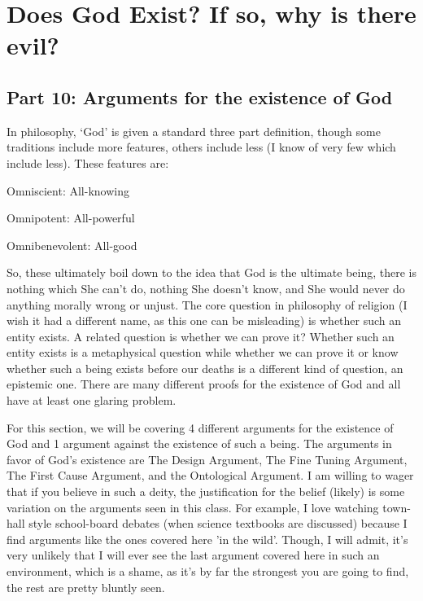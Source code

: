 \part{Does God Exist? If so, why is there evil?}
\label{ch.modfive}
\chapter{Part 10: Arguments for the existence of God}
In philosophy, ‘God’ is given a standard three part definition, though some traditions include more features, others include less (I know of very few which include less). These features are:
\begin{earg}
    \item[]Omniscient: All-knowing
    \item[]Omnipotent: All-powerful
    \item[]Omnibenevolent: All-good
\end{earg}
So, these ultimately boil down to the idea that God is the ultimate being, there is nothing which She can't do, nothing She doesn't know, and She would never do anything morally wrong or unjust. The core question in philosophy of religion (I wish it had a different name, as this one can be misleading) is whether such an entity exists. A related question is whether we can prove it? Whether such an entity exists is a metaphysical question while whether we can prove it or know whether such a being exists before our deaths is a different kind of question, an epistemic one. There are many different proofs for the existence of God and all have at least one glaring problem.

For this section, we will be covering 4 different arguments for the existence of God and 1 argument against the existence of such a being. The arguments in favor of God's existence are The Design Argument, The Fine Tuning Argument, The First Cause Argument, and the Ontological Argument. I am willing to wager that if you believe in such a deity, the justification for the belief (likely) is some variation on the arguments seen in this class. For example, I love watching town-hall style school-board debates (when science textbooks are discussed) because I find arguments like the ones covered here 'in the wild'. Though, I will admit, it's very unlikely that I will ever see the last argument covered here in such an environment, which is a shame, as it's by far the strongest you are going to find, the rest are pretty bluntly seen.  

